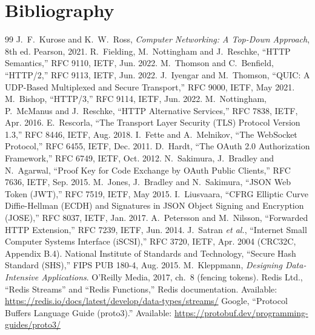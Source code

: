 \section{Bibliography}\label{sec:biblio}
{\renewcommand{\section}[2]{}%
\begin{thebibliography}{99}\small\setlength{\itemsep}{1pt}
 J.~F.~Kurose and K.~W.~Ross, \emph{Computer Networking: A Top-Down Approach}, 8th ed. Pearson, 2021.
 R.~Fielding, M.~Nottingham and J.~Reschke, ``HTTP Semantics,'' RFC 9110, IETF, Jun. 2022.
 M.~Thomson and C.~Benfield, ``HTTP/2,'' RFC 9113, IETF, Jun. 2022.
 J.~Iyengar and M.~Thomson, ``QUIC: A UDP-Based Multiplexed and Secure Transport,'' RFC 9000, IETF, May 2021.
 M.~Bishop, ``HTTP/3,'' RFC 9114, IETF, Jun. 2022.
 M.~Nottingham, P.~McManus and J.~Reschke, ``HTTP Alternative Services,'' RFC 7838, IETF, Apr. 2016.
 E.~Rescorla, ``The Transport Layer Security (TLS) Protocol Version 1.3,'' RFC 8446, IETF, Aug. 2018.
 I.~Fette and A.~Melnikov, ``The WebSocket Protocol,'' RFC 6455, IETF, Dec. 2011.
 D.~Hardt, ``The OAuth 2.0 Authorization Framework,'' RFC 6749, IETF, Oct. 2012.
 N.~Sakimura, J.~Bradley and N.~Agarwal, ``Proof Key for Code Exchange by OAuth Public Clients,'' RFC 7636, IETF, Sep. 2015.
 M.~Jones, J.~Bradley and N.~Sakimura, ``JSON Web Token (JWT),'' RFC 7519, IETF, May 2015.
 I.~Liusvaara, ``CFRG Elliptic Curve Diffie-Hellman (ECDH) and Signatures in JSON Object Signing and Encryption (JOSE),'' RFC 8037, IETF, Jan. 2017.
 A.~Petersson and M.~Nilsson, ``Forwarded HTTP Extension,'' RFC 7239, IETF, Jun. 2014.
 J.~Satran \emph{et al.}, ``Internet Small Computer Systems Interface (iSCSI),'' RFC 3720, IETF, Apr. 2004 (CRC32C, Appendix B.4).
 National Institute of Standards and Technology, ``Secure Hash Standard (SHS),'' FIPS PUB 180-4, Aug. 2015.
 M.~Kleppmann, \emph{Designing Data-Intensive Applications}. O'Reilly Media, 2017, ch.~8 (fencing tokens).
 Redis Ltd., ``Redis Streams'' and ``Redis Functions,'' Redis documentation. Available: \url{https://redis.io/docs/latest/develop/data-types/streams/}
 Google, ``Protocol Buffers Language Guide (proto3).'' Available: \url{https://protobuf.dev/programming-guides/proto3/}

\end{thebibliography}}
